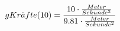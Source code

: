 \documentclass[preview]{standalone}
\begin{document}
\begin{align*}
\special{dvisvgm:raw <g id='unique000'>}gKr\ddot{a}fte(10) = \frac{10 \cdot \frac{Meter}{Sekunde^{2}}}{9.81 \cdot \frac{Meter}{Sekunde^{2}}}\special{dvisvgm:raw </g>}
\end{align*}
\end{document}
